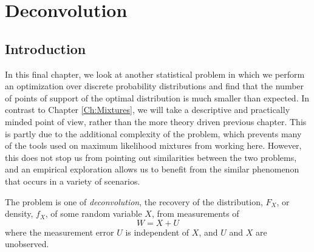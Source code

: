 \chapter{Deconvolution}
\label{Ch:Deconvolution}




\section{Introduction}
	In this final chapter, we look at another statistical problem in which we perform an optimization over discrete probability distributions and find that the number of points of support of the optimal distribution is much smaller than expected. In contrast to Chapter \ref{Ch:Mixtures}, we will take a descriptive and practically minded point of view, rather than the more theory driven previous chapter. This is partly due to the additional complexity of the problem, which prevents many of the tools used on maximum likelihood mixtures from working here. However, this does not stop us from pointing out similarities between the two problems, and an empirical exploration allows us to benefit from the similar phenomenon that occurs in a variety of scenarios.

	The problem is one of \emph{deconvolution}, the recovery of the distribution, $F_X$, or density, $f_X$, of some random variable $X$, from measurements of
	\begin{equation}
		W = X + U
		\label{eq:W=X+U}
	\end{equation}
	where the measurement error $U$ is independent of $X$, and $U$ and $X$ are unobserved. %

